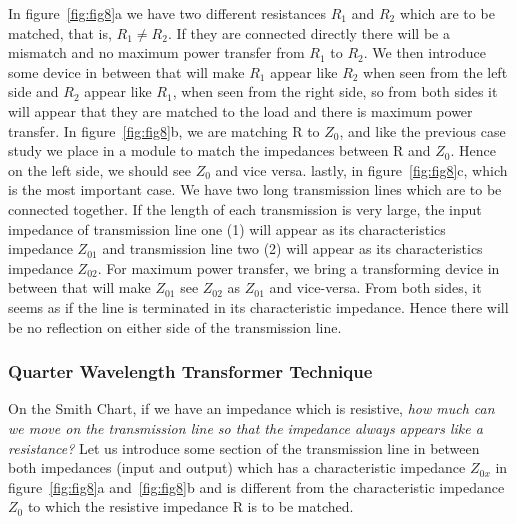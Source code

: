 In figure~{\ref{fig:fig8}a} we have two different resistances $R_1$ and $R_2$ which are to be matched, that is, $R_1\neq R_2$. If they are connected directly there will be a mismatch and no maximum power transfer from $R_1$ to $R_2$. We then introduce some device in between that will make $R_1$ appear like $R_2$ when seen from the left side and $R_2$ appear like $R_1$, when seen from the right side, so from both sides it will appear that they are matched to the load and there is maximum power transfer. In figure~\ref{fig:fig8}b, we are matching R to $Z_0$, and like the previous case study we place in a module to match the impedances between R and $Z_0$. Hence on the left side, we should see $Z_0$ and vice versa. lastly, in figure~{\ref{fig:fig8}c}, which is the most important case. We have two long transmission lines which are to be connected together. If the length of each transmission is very large, the input impedance of transmission line one (1) will appear as its characteristics impedance $ Z_{01}$ and transmission line two (2) will appear as its characteristics impedance $ Z_{02}$. For maximum power transfer, we bring a transforming device in between that will make $Z_{01}$ see $Z_{02}$ as $Z_{01}$ and vice-versa. From both sides, it seems as if the line is terminated in its characteristic impedance. Hence there will be no reflection on either side of the transmission line.

\subsubsection{Quarter Wavelength Transformer Technique}
On the Smith Chart, if we have an impedance which is resistive, \emph{how much can we move on the transmission line so that the impedance always appears like a resistance?} Let us introduce some section of the transmission line in between both impedances (input and output) which has a characteristic impedance $ Z_{0x}$ in figure~{\ref{fig:fig8}a} and~\ref{fig:fig8}b and is different from the characteristic impedance $ Z_0$ to which the resistive impedance R is to be matched.

